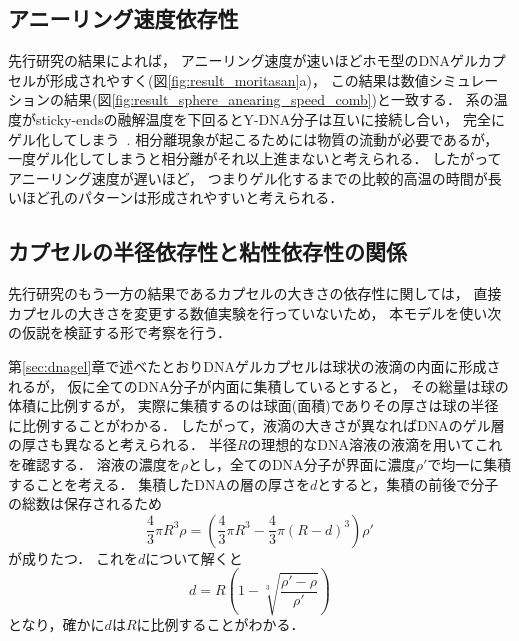 \subsection{アニーリング速度依存性}
先行研究の結果によれば，
アニーリング速度が速いほどホモ型のDNAゲルカプセルが形成されやすく(図\ref{fig:result_moritasan}a)，
この結果は数値シミュレーションの結果(図\ref{fig:result_sphere_anearing_speed_comb})と一致する．
系の温度がsticky-endsの融解温度を下回るとY-DNA分子は互いに接続し合い，
完全にゲル化してしまう~\cite{sato2019sequence}.
相分離現象が起こるためには物質の流動が必要であるが，
一度ゲル化してしまうと相分離がそれ以上進まないと考えられる．
したがってアニーリング速度が遅いほど，
つまりゲル化するまでの比較的高温の時間が長いほど孔のパターンは形成されやすいと考えられる．

\subsection{カプセルの半径依存性と粘性依存性の関係}
先行研究のもう一方の結果であるカプセルの大きさの依存性に関しては，
直接カプセルの大きさを変更する数値実験を行っていないため，
本モデルを使い次の仮説を検証する形で考察を行う．

第\ref{sec:dnagel}章で述べたとおりDNAゲルカプセルは球状の液滴の内面に形成されるが，
仮に全てのDNA分子が内面に集積しているとすると，
その総量は球の体積に比例するが，
実際に集積するのは球面(面積)でありその厚さは球の半径に比例することがわかる．
したがって，液滴の大きさが異なればDNAのゲル層の厚さも異なると考えられる．
半径$R$の理想的なDNA溶液の液滴を用いてこれを確認する．
溶液の濃度を$\rho$とし，全てのDNA分子が界面に濃度$\rho'$で均一に集積することを考える．
集積したDNAの層の厚さを$d$とすると，集積の前後で分子の総数は保存されるため
\begin{equation}
    \frac{4}{3}\pi R^3 \rho = \left(\frac{4}{3}\pi R^3-\frac{4}{3}\pi(R-d)^3\right)\rho'
\end{equation}
が成りたつ．
これを$d$について解くと
\begin{equation}
    d = R\left(1-\sqrt[3]{\frac{\rho'-\rho}{\rho'}}\right)
\end{equation}
となり，確かに$d$は$R$に比例することがわかる．

